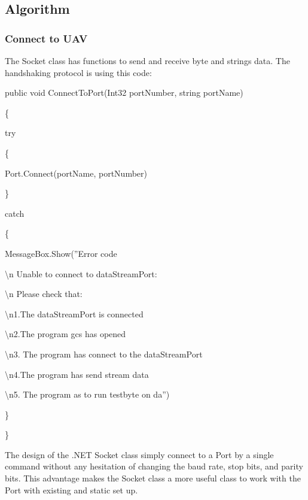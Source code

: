 \documentclass[oneside]{ecsgdp}         %
\begin{document}
\subsection{Algorithm}
\subsubsection*{Connect to UAV}
The Socket class has functions to send and receive byte and strings data. The handshaking protocol is using this code:
\newcommand{\tab}{\hspace*{2em}}

        public void ConnectToPort(Int32 portNumber, string portName)
        
        \{
        
            \tab try
            
            \tab \{

            \tab \tab     Port.Connect(portName, portNumber)\;
                
            \tab \}
            
            \tab catch 
            
            \tab \{
            
            \tab \tab     MessageBox.Show(''Error code
                
            \tab \tab     \textbackslash n Unable to connect to dataStreamPort:
                
            \tab \tab     \textbackslash n Please check that:
                
             \tab \tab    \textbackslash n1.The dataStreamPort is connected 
                
             \tab \tab    \textbackslash n2.The program gcs has opened 
                
            \tab \tab     \textbackslash n3. The program has connect to the dataStreamPort
                
             \tab \tab    \textbackslash n4.The program has send stream data
                
            \tab \tab     \textbackslash n5. The program as to run testbyte on da'')\;
                
           \tab  \}
            
        \}
        

        
	The design of the .NET Socket class simply connect to a Port by a single command without any hesitation of changing the baud rate, stop bits, and parity bits. This advantage makes the Socket class a more useful class to work with the Port with existing and static set up. 
\end{document}
